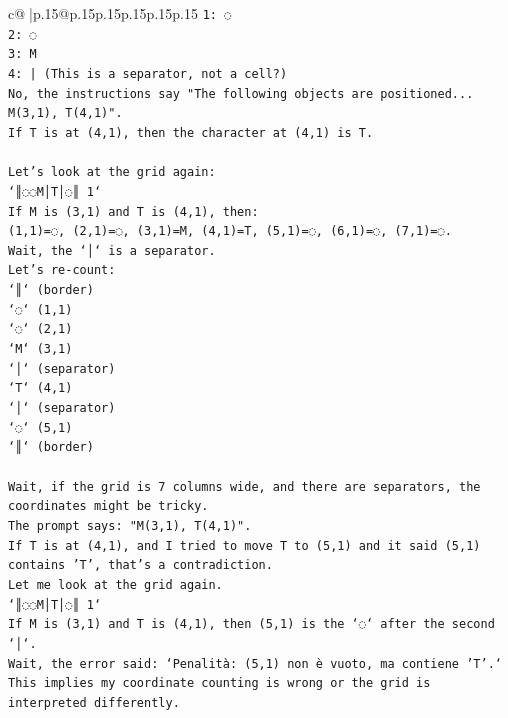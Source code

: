\documentclass{article}
\begin{document}
{\begin{supertabular}{c@{$\;$}|p{.15\linewidth}@{}p{.15\linewidth}p{.15\linewidth}p{.15\linewidth}p{.15\linewidth}p{.15\linewidth}}
{{{\texttt{1: ◌} \\
\texttt{2: ◌} \\
\texttt{3: M} \\
\texttt{4: | (This is a separator, not a cell?)} \\
\texttt{No, the instructions say "The following objects are positioned... M(3,1), T(4,1)".} \\
\texttt{If T is at (4,1), then the character at (4,1) is T.} \\
\\ 
\texttt{Let's look at the grid again:} \\
\texttt{`║◌◌M│T│◌║ 1`} \\
\texttt{If M is (3,1) and T is (4,1), then:} \\
\texttt{(1,1)=◌, (2,1)=◌, (3,1)=M, (4,1)=T, (5,1)=◌, (6,1)=◌, (7,1)=◌.} \\
\texttt{Wait, the `│` is a separator.} \\
\texttt{Let's re{-}count:} \\
\texttt{`║` (border)} \\
\texttt{`◌` (1,1)} \\
\texttt{`◌` (2,1)} \\
\texttt{`M` (3,1)} \\
\texttt{`│` (separator)} \\
\texttt{`T` (4,1)} \\
\texttt{`│` (separator)} \\
\texttt{`◌` (5,1)} \\
\texttt{`║` (border)} \\
\\ 
\texttt{Wait, if the grid is 7 columns wide, and there are separators, the coordinates might be tricky.} \\
\texttt{The prompt says: "M(3,1), T(4,1)".} \\
\texttt{If T is at (4,1), and I tried to move T to (5,1) and it said (5,1) contains 'T', that's a contradiction.} \\
\texttt{Let me look at the grid again.} \\
\texttt{`║◌◌M│T│◌║ 1`} \\
\texttt{If M is (3,1) and T is (4,1), then (5,1) is the `◌` after the second `│`.} \\
\texttt{Wait, the error said: `Penalità: (5,1) non è vuoto, ma contiene 'T'.`} \\
\texttt{This implies my coordinate counting is wrong or the grid is interpreted differently.} \\
\\ 
}}}
\end{supertabular}}
\end{document}
